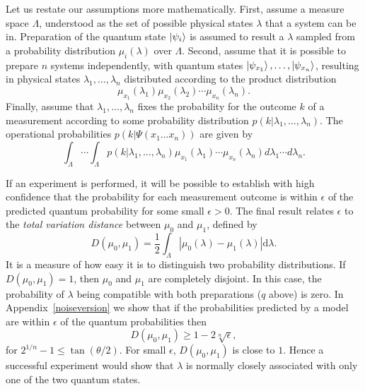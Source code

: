 \documentclass[amsmath,amssymb,superscriptaddress,pra,12pt]{revtex4-1}
\begin{document}
Let us restate our assumptions more mathematically. First, assume a measure space $\Lambda$, understood as the set of possible physical states $\lambda$ that a system can be in. Preparation of the quantum state $\ket{\psi_i}$ is assumed to result a $\lambda$ sampled from a probability distribution $\mu_i(\lambda)$ over $\Lambda$. Second, assume that it is possible to prepare $n$ systems independently, with quantum states $\ket{\psi_{x_1}}, \dotsc, \ket{\psi_{x_n}}$, resulting in physical states $\lambda_1, \dotsc, \lambda_n$ distributed according to the product distribution
\begin{equation}
 \mu_{x_1}(\lambda_1)\mu_{x_2}(\lambda_2)\dotsm\mu_{x_n}(\lambda_n).
\end{equation}
Finally, assume that $\lambda_1, \dotsc, \lambda_n$ fixes the probability for the outcome $k$ of a measurement according to some probability distribution $p(k|\lambda_1, \dotsc, \lambda_n)$. The operational probabilities $p\left( k|\Psi(x_1\ldots x_n)\right)$  are given by
\begin{equation}
  \int_\Lambda \dotsm \int_\Lambda p(k|\lambda_1, \dotsc, \lambda_n)\mu_{x_1}(\lambda_1)\dotsm \mu_{x_n}(\lambda_n) d\lambda_1 \dotsm d\lambda_n.
\end{equation}

If an experiment is performed, it will be possible to establish with high confidence that the probability for each measurement outcome is within $\epsilon$ of the predicted quantum probability for some small $\epsilon > 0$. The final result relates $\epsilon$ to the \emph{total variation distance} \cite{probmet} between $\mu_0$ and $\mu_1$, defined by
\begin{equation}
D(\mu_0,\mu_1) = \frac12\int_{\Lambda} |\mu_0(\lambda) - \mu_1(\lambda)| \mathrm{d}\lambda.
\end{equation}
It is a measure of how easy it is to distinguish two probability distributions. If $D(\mu_0,\mu_1)=1$, then $\mu_0$ and $\mu_1$ are completely disjoint. In this case, the probability of $\lambda$ being compatible with both preparations ($q$ above) is zero. In Appendix~\ref{noiseversion} we show that if the probabilities predicted by a model are within $\epsilon$ of the quantum probabilities then
\begin{equation}
D(\mu_0,\mu_1) \geq 1 - 2\sqrt[n]{\epsilon},
\label{finalresult}
\end{equation}
for $2^{1/n} - 1 \leq \tan (\theta/2)$.
For small $\epsilon$, $D(\mu_0,\mu_1)$ is close to $1$. Hence a successful experiment would show that $\lambda$ is normally closely associated with only one of the two quantum states.
\end{document}
